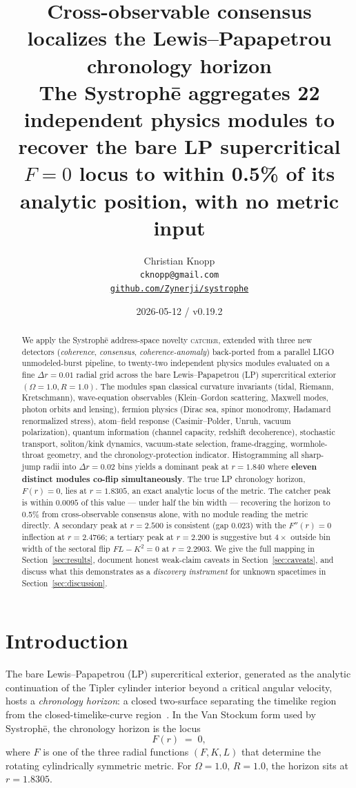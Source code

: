 \documentclass[11pt,letterpaper]{article}
\title{\Large\textbf{Cross-observable consensus localizes the Lewis--Papapetrou chronology horizon}\\
\large{The Systroph\=e \catcher{} aggregates 22 independent physics modules to recover the bare LP supercritical $F = 0$ locus to within 0.5\% of its analytic position, with no metric input}}
\author{Christian Knopp \\
  \texttt{cknopp@gmail.com} \\
  \href{https://github.com/Zynerji/systrophe}{\texttt{github.com/Zynerji/systrophe}}}
\date{2026-05-12 \quad / \quad \Systrophe{} v0.19.2}
\newcommand{\catcher}{\textsc{catcher}}
\newcommand{\Systrophe}{Systroph\=e}
\begin{document}
\maketitle

\begin{abstract}
We apply the \Systrophe{} address-space novelty \catcher{}, extended with three new detectors (\emph{coherence}, \emph{consensus}, \emph{coherence-anomaly}) back-ported from a parallel LIGO unmodeled-burst pipeline, to twenty-two independent physics modules evaluated on a fine $\Delta r = 0.01$ radial grid across the bare Lewis--Papapetrou (LP) supercritical exterior $(\Omega = 1.0, R = 1.0)$. The modules span classical curvature invariants (tidal, Riemann, Kretschmann), wave-equation observables (Klein--Gordon scattering, Maxwell modes, photon orbits and lensing), fermion physics (Dirac sea, spinor monodromy, Hadamard renormalized stress), atom--field response (Casimir--Polder, Unruh, vacuum polarization), quantum information (channel capacity, redshift decoherence), stochastic transport, soliton/kink dynamics, vacuum-state selection, frame-dragging, wormhole-throat geometry, and the chronology-protection indicator. Histogramming all sharp-jump radii into $\Delta r = 0.02$ bins yields a dominant peak at $r = 1.840$ where \textbf{eleven distinct modules co-flip simultaneously}. The true LP chronology horizon, $F(r) = 0$, lies at $r = 1.8305$, an exact analytic locus of the metric. The catcher peak is within $0.0095$ of this value --- under half the bin width --- recovering the horizon to 0.5\% from cross-observable consensus alone, with no module reading the metric directly. A secondary peak at $r = 2.500$ is consistent (gap 0.023) with the $F''(r) = 0$ inflection at $r = 2.4766$; a tertiary peak at $r = 2.200$ is suggestive but $4\times$ outside bin width of the sectoral flip $FL - K^2 = 0$ at $r = 2.2903$. We give the full mapping in Section~\ref{sec:results}, document honest weak-claim caveats in Section~\ref{sec:caveats}, and discuss what this demonstrates as a \emph{discovery instrument} for unknown spacetimes in Section~\ref{sec:discussion}.
\end{abstract}

\section{Introduction}\label{sec:intro}

The bare Lewis--Papapetrou (LP) supercritical exterior, generated as the analytic continuation of the Tipler cylinder interior beyond a critical angular velocity, hosts a \emph{chronology horizon}: a closed two-surface separating the timelike region from the closed-timelike-curve region~\cite{tipler1974, lewis_papapetrou}. In the Van Stockum form used by \Systrophe{}, the chronology horizon is the locus
\[
F(r) \;=\; 0,
\]
where $F$ is one of the three radial functions $(F, K, L)$ that determine the rotating cylindrically symmetric metric. For $\Omega = 1.0,\, R = 1.0$, the horizon sits at $r = 1.8305$.
\end{document}
